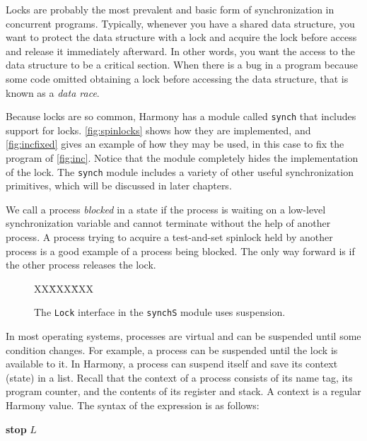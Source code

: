 \documentclass{report}
\newcommand{\harmonysource}[1]{
\begin{tabbing}
XX\=XXX\=XXX\kill
    
\end{tabbing}
}
\newenvironment{code}{
\tcolorbox
}{
\endtcolorbox
}
\begin{document}
Locks are probably the most prevalent and basic form of synchronization
in concurrent programs.  Typically, whenever you have a shared data
structure, you want to protect the data structure with a lock and
acquire the lock before access and release it immediately afterward.
In other words, you want the access to the data structure to be a
critical section.
When there is a bug in a program because some code omitted obtaining
a lock before accessing the data structure, that is known as a
\emph{data race}.

Because locks are so common, Harmony has a module called
\texttt{synch} that includes support for locks.
\autoref{fig:spinlocks} shows how they are implemented, and
\autoref{fig:incfixed} gives an example of how they may be used,
in this case to fix the program of \autoref{fig:inc}.
Notice that the module completely hides the implementation of the
lock.
The \texttt{synch} module includes a variety of other useful
synchronization primitives, which will be discussed in later
chapters.

%

We call a process \emph{blocked}
%
in a state if the process is waiting on a low-level synchronization
variable and cannot terminate without the help of another process.
A process trying to
acquire a test-and-set spinlock held by another process is a good example
of a process being blocked.
The only way forward is if the other process releases the lock.

\begin{figure}
\begin{code}
\harmonysource{locksusp}
\end{code}
\caption{The \texttt{Lock} interface in the \texttt{synchS} module uses suspension.}
\label{fig:suspension}
\end{figure}

In most operating systems, processes are virtual and can be suspended
until some condition changes.  For example, a process can be suspended
until the lock is available to it.
In Harmony, a process can suspend itself and save its context (state) in a
list.  Recall that the context of a process consists of its name tag,
its program counter, and the contents of its register and stack.
A context is a regular Harmony value.
The syntax of the expression is as follows:

\begin{code}
\textbf{stop} $L$
\end{code}
\end{document}
